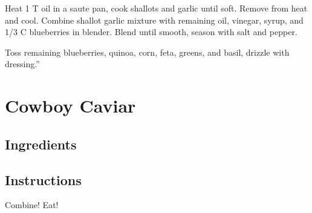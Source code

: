 \documentclass[letterpaper,10pt,english]{sphinxmanual}
\begin{document}
Heat 1 T oil in a saute pan, cook shallots and garlic until soft. Remove from heat and cool. Combine shallot garlic mixture with remaining oil, vinegar, syrup, and 1/3 C blueberries in blender. Blend until smooth, season with salt and pepper.

Toss remaining blueberries, quinoa, corn, feta, greens, and basil, drizzle with dressing.”


\chapter{Cowboy Caviar}
\label{\detokenize{Cowboy_Caviar:cowboy-caviar}}\label{\detokenize{Cowboy_Caviar::doc}}

\section{Ingredients}
\label{\detokenize{Cowboy_Caviar:ingredients}}
%
\begin{sphinxVerbatim}[commandchars=\\\{\}]
       

   

   

    

   

   

    

  

   

    
\end{sphinxVerbatim}


\section{Instructions}
\label{\detokenize{Cowboy_Caviar:instructions}}
Combine! Eat!
\end{document}
